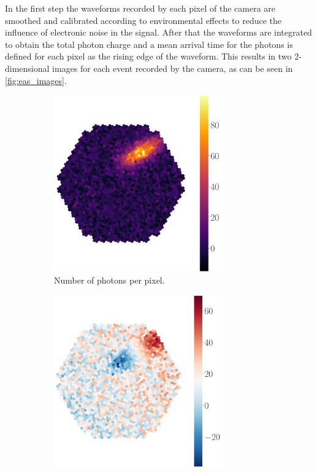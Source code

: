 In the first step the waveforms recorded by each pixel of the camera are smoothed and calibrated according to environmental effects to reduce the influence
of electronic noise in the signal.
After that the waveforms are integrated to obtain the total photon charge and a mean arrival time for the photons is defined for each pixel 
as the rising edge of the waveform.
This results in two 2-dimensional images for each event recorded by the camera, as can be seen in \autoref{fig:eas_images}.
\begin{figure}
    \centering
    \begin{subfigure}{0.49\textwidth}
        \centering
        \includegraphics[width=0.8\textwidth]{images/eas_image1.png}
        \caption{Number of photons per pixel.}
        \label{fig:eas_image1}
    \end{subfigure}
    \hfill
    \begin{subfigure}{0.49\textwidth}
        \centering
        \includegraphics[width=0.8\textwidth]{images/eas_image2.png}

\end{subfigure}
\end{figure}
